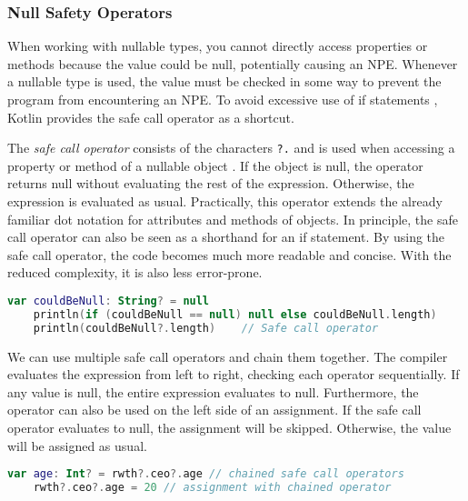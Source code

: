 \documentclass[a4paper, 11pt]{article}
\begin{document}
\subsubsection{Null Safety Operators}
  When working with nullable types, you cannot directly access properties or methods because the value could be null, potentially causing an NPE. Whenever a nullable type is used, the value must be checked in some way to prevent the program from encountering an NPE. To avoid excessive use of if statements \cite{nullsafety-if-condition}, Kotlin provides the safe call operator as a shortcut.

  The \textit{safe call operator} consists of the characters \texttt{?.} and is used when accessing a property or method of a nullable object \cite{nullsafety-safe-call}. If the object is null, the operator returns null without evaluating the rest of the expression. Otherwise, the expression is evaluated as usual. Practically, this operator extends the already familiar dot notation for attributes and methods of objects. In principle, the safe call operator can also be seen as a shorthand for an if statement. By using the safe call operator, the code becomes much more readable and concise. With the reduced complexity, it is also less error-prone.

  \begin{lstlisting}[language=Kotlin,title={Using the safe call operator in comparison to an if statement}]
    var couldBeNull: String? = null
    println(if (couldBeNull == null) null else couldBeNull.length)
    println(couldBeNull?.length)    // Safe call operator
  \end{lstlisting}
  We can use multiple safe call operators and chain them together. The compiler evaluates the expression from left to right, checking each operator sequentially. If any value is null, the entire expression evaluates to null.
  Furthermore, the operator can also be used on the left side of an assignment. If the safe call operator evaluates to null, the assignment will be skipped. Otherwise, the value will be assigned as usual.
  \begin{lstlisting}[language=Kotlin]
    var age: Int? = rwth?.ceo?.age // chained safe call operators
    rwth?.ceo?.age = 20 // assignment with chained operator
  \end{lstlisting}
\end{document}
